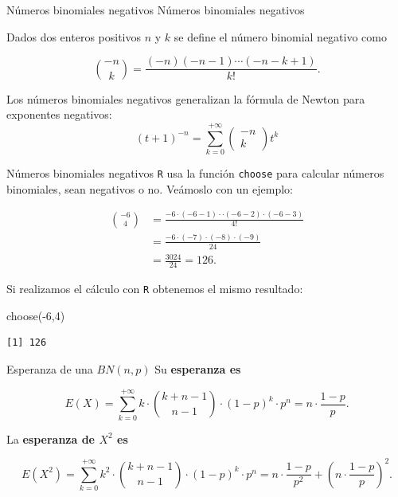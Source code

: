 \documentclass[
  ignorenonframetext,
  aspectratio=169]{beamer}
\newenvironment{Shaded}{\begin{snugshade}}{\end{snugshade}}
\newcommand{\DecValTok}[1]{\textcolor[rgb]{0.68,0.00,0.00}{#1}}
\newcommand{\FunctionTok}[1]{\textcolor[rgb]{0.28,0.35,0.67}{#1}}
\newcommand{\NormalTok}[1]{\textcolor[rgb]{0.00,0.23,0.31}{#1}}
\newcommand{\SpecialCharTok}[1]{\textcolor[rgb]{0.37,0.37,0.37}{#1}}
\begin{document}
\begin{frame}{Números binomiales negativos}
\protect\hypertarget{nuxfameros-binomiales-negativos}{}
Números binomiales negativos

Dados dos enteros positivos \(n\) y \(k\) se define el número binomial
negativo como

\[\binom{-n}{k}=\frac{(-n)(-n-1)\cdots (-n-k+1)}{k!}.\]

Los números binomiales negativos generalizan la fórmula de Newton para
exponentes negativos: \[
(t+1)^{-n}=\sum_{k=0}^{+\infty}\left(\begin{array}{c} -n
\\ k\end{array}\right) t^{k}
\]
\end{frame}

\begin{frame}[fragile]{Números binomiales negativos}
\protect\hypertarget{nuxfameros-binomiales-negativos-1}{}
\texttt{R} usa la función \texttt{choose} para calcular números
binomiales, sean negativos o no. Veámoslo con un ejemplo:

\[
\begin{array}{rl}
{-6\choose 4}&=\frac{-6\cdot (-6-1)\cdot \cdot (-6-2)\cdot (-6-3) }{4!}\\
&=  \frac{-6\cdot(-7)\cdot (-8)\cdot (-9)}{24}\\
&= \frac{3024}{24}=126.
\end{array}
\]

Si realizamos el cálculo con \texttt{R} obtenemos el mismo resultado:

\begin{Shaded}
\begin{Highlighting}[]
\FunctionTok{choose}\NormalTok{(}\SpecialCharTok{{-}}\DecValTok{6}\NormalTok{,}\DecValTok{4}\NormalTok{)}
\end{Highlighting}
\end{Shaded}

\begin{verbatim}
[1] 126
\end{verbatim}
\end{frame}

\begin{frame}{Esperanza de una \(BN(n,p)\)}
\protect\hypertarget{esperanza-de-una-bnnp}{}
Su \textbf{esperanza es}

\[E(X)=\sum_{k=0}^{+\infty} k\cdot {k+n-1\choose n-1} \cdot (1-p)^{k}\cdot p^n=n\cdot\frac{1-p}{p}.\]

La \textbf{esperanza de \(X^2\) es}

\[E(X^2)=\sum_{k=0}^{+\infty} k^2\cdot {k+n-1\choose n-1} \cdot (1-p)^{k}\cdot p^n=n\cdot\frac{1-p}{p^2}+\left(n\cdot \frac{1-p}{p}\right)^2.\]
\end{frame}
\end{document}
